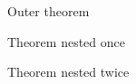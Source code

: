 \documentclass{article}
\theoremstyle{plain}
\begin{document}
\noindent \lipsum[1]
\begin{thm}
	Outer theorem
	\begin{thm}
		Theorem nested once
		\begin{thm}
			Theorem nested twice
		\end{thm}
	\end{thm}
\end{thm}
\end{document}
